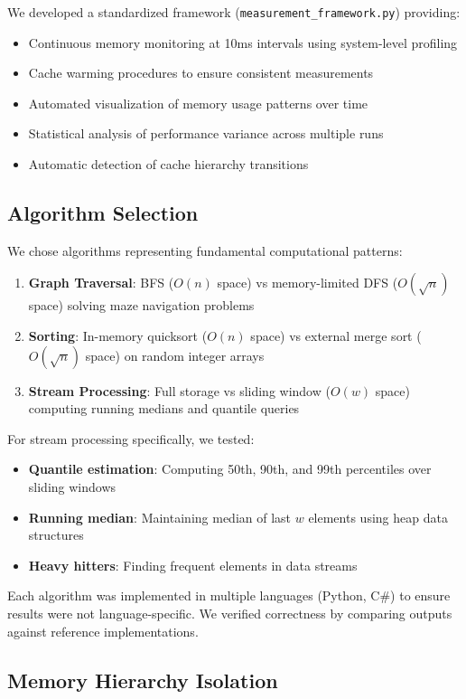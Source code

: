 \documentclass[11pt]{article}
\theoremstyle{definition}
\begin{document}
We developed a standardized framework (\texttt{measurement\_framework.py}) providing:
\begin{itemize}
\item Continuous memory monitoring at 10ms intervals using system-level profiling
\item Cache warming procedures to ensure consistent measurements  
\item Automated visualization of memory usage patterns over time
\item Statistical analysis of performance variance across multiple runs
\item Automatic detection of cache hierarchy transitions
\end{itemize}

\subsection{Algorithm Selection}

We chose algorithms representing fundamental computational patterns:
\begin{enumerate}
\item \textbf{Graph Traversal}: BFS ($O(n)$ space) vs memory-limited DFS ($O(\sqrt{n})$ space) solving maze navigation problems
\item \textbf{Sorting}: In-memory quicksort ($O(n)$ space) vs external merge sort ($O(\sqrt{n})$ space) on random integer arrays
\item \textbf{Stream Processing}: Full storage vs sliding window ($O(w)$ space) computing running medians and quantile queries
\end{enumerate}

For stream processing specifically, we tested:
\begin{itemize}
\item \textbf{Quantile estimation}: Computing 50th, 90th, and 99th percentiles over sliding windows
\item \textbf{Running median}: Maintaining median of last $w$ elements using heap data structures
\item \textbf{Heavy hitters}: Finding frequent elements in data streams
\end{itemize}

Each algorithm was implemented in multiple languages (Python, C\#) to ensure results were not language-specific. We verified correctness by comparing outputs against reference implementations.

\subsection{Memory Hierarchy Isolation}
\end{document}
